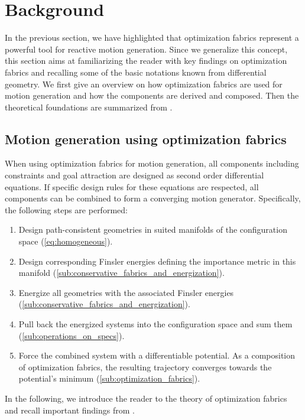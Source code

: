 \section{Background}%
\label{sec:mathematics}

In the previous section, we have highlighted that optimization fabrics represent a
powerful tool for reactive motion generation. Since we generalize this concept, this
section aims at familiarizing the reader with key findings on optimization fabrics and
recalling some of the basic notations known from differential geometry. 
We first give an overview on how optimization fabrics are used for motion generation
and how the components are derived and composed. Then the theoretical foundations
are summarized from \cite{Cheng2020,Ratliff2020}.

\subsection{Motion generation using optimization fabrics}%
\label{sub:trajectory_generation_using_optimization_fabrics}

When using optimization fabrics for motion generation, all components including constraints and 
goal attraction are designed as second order differential equations. If specific design
rules for these equations are respected, all components can be combined to 
form a converging motion generator. Specifically, the following steps are performed:
%
\begin{enumerate}
  \item Design path\hyp{}consistent geometries in suited manifolds of the configuration space
    (\cref{eq:homogeneous}).
  \item Design corresponding Finsler energies defining the importance metric in this manifold
    (\cref{sub:conservative_fabrics_and_energization}).
  \item Energize all geometries with the associated Finsler energies 
    (\cref{sub:conservative_fabrics_and_energization}).
  \item Pull back the energized systems into the configuration space and sum them 
    (\cref{sub:operations_on_specs}).
  \item Force the combined system with a differentiable potential. As a composition of optimization fabrics, 
    the resulting trajectory converges towards the potential's minimum
    (\cref{sub:optimization_fabrics}).
\end{enumerate}
In the following, we introduce the reader to the theory of optimization fabrics
and recall important findings from \cite{Ratliff2020}.

